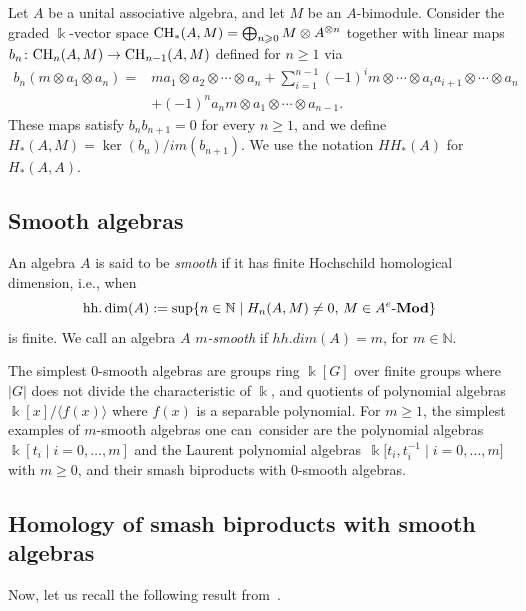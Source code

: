 \documentclass[pdftex]{sigma}
\newcommand{\B}[1]{\mathbb{#1}}
\newcommand{\lmod}[1]{{#1}\text{-{\bf Mod}}}
\newcommand{\CH}{{\rm CH}}
\renewcommand{\geq}{\geqslant}
\numberwithin{equation}{section}
\begin{document}
Let $A$ be a unital associative algebra, and let $M$ be an $A$-bimodule. Consider the
graded $\Bbbk$-vector space
$\CH_*(A,M) = \bigoplus_{n\geq 0} M\otimes A^{\otimes n} $ together with linear maps
$b_n\colon \CH_n(A,M)\to\CH_{n-1}(A,M)$ defined for $n\geq 1$ via
\begin{align*}
 b_n(m\otimes a_1\otimes a_n)
 = {}& m a_1\otimes a_2\otimes\cdots\otimes a_n + \sum_{i=1}^{n-1}(-1)^i m\otimes\cdots\otimes a_ia_{i+1}\otimes\cdots\otimes a_n \\
 & + (-1)^n a_n m \otimes a_1\otimes\cdots\otimes a_{n-1}.
\end{align*}
These maps satisfy $b_nb_{n+1} = 0$ for every $n\geq 1$, and we define
$H_*(A,M) = \ker(b_n)/im(b_{n+1})$. We use the notation $HH_*(A)$ for $H_*(A,A)$.

\subsection{Smooth algebras}\label{sect:smooth}

An algebra $A$ is said to be \emph{smooth} if it has finite Hochschild homological
dimension, i.e., when
\[ \operatorname{ hh.dim}(A) := \sup\{n\in\B{N}\mid H_n(A,M)\neq 0,\,M\in\lmod{A^e}\} \] is finite. We call
an algebra $A$ \emph{$m$-smooth} if $hh.dim(A)=m$, for $m\in\B{N}$.

The simplest $0$-smooth algebras are groups ring $\Bbbk[G]$ over finite groups where $|G|$
does not divide the characteristic of $\Bbbk$, and quotients of polynomial algebras
$\Bbbk[x]/\langle f(x)\rangle$ where $f(x)$ is a separable polynomial. For $m\geq 1$, the
simplest examples of $m$-smooth algebras one can~consider are the polynomial algebras
$\Bbbk[t_i\mid i=0,\ldots,m]$ and the Laurent polynomial algebras~${\Bbbk\big[t_i,t_i^{-1}\mid i=0,\ldots,m\big]}$ with $m\geq 0$, and their smash biproducts with
$0$-smooth algebras.

\subsection{Homology of smash biproducts with smooth algebras}
Now, let us recall the following result
from~\cite[Proposition~1.5]{KaygunSutlu:HomologyOfQuantumLinearGroups}.
\end{document}
